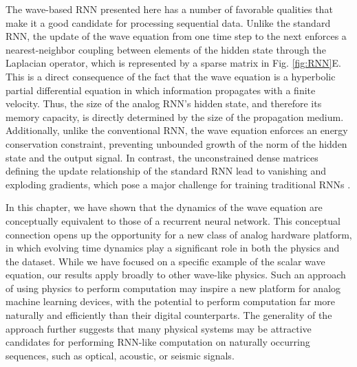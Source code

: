 The wave-based RNN presented here has a number of favorable qualities that make it a good candidate for processing sequential data.
Unlike the standard RNN, the update of the wave equation from one time step to the next enforces a nearest-neighbor coupling between elements of the hidden state through the Laplacian operator, which is represented by a sparse matrix in Fig. \ref{fig:RNN}E. 
This is a direct consequence of the fact that the wave equation is a hyperbolic partial differential equation in which information propagates with a finite velocity. 
Thus, the size of the analog RNN's hidden state, and therefore its memory capacity, is directly determined by the size of the propagation medium. 
Additionally, unlike the conventional RNN, the wave equation enforces an energy conservation constraint, preventing unbounded growth of the norm of the hidden state and the output signal.
In contrast, the unconstrained dense matrices defining the update relationship of the standard RNN lead to vanishing and exploding gradients, which pose a major challenge for training traditional RNNs \cite{jing2017tunable}.

In this chapter, we have shown that the dynamics of the wave equation are conceptually equivalent to those of a recurrent neural network.
This conceptual connection opens up the opportunity for a new class of analog hardware platform, in which evolving time dynamics play a significant role in both the physics and the dataset.
While we have focused on a specific example of the scalar wave equation, our results apply broadly to other wave-like physics.
Such an approach of using physics to perform computation \cite{silva_performing_2014, hermans_trainable_2015, guo_photonic_2018, lin2018all, kwon_nonlocal_2018, estakhri_inverse-designed_2019} may inspire a new platform for analog machine learning devices, with the potential to perform computation far more naturally and efficiently than their digital counterparts.
The generality of the approach further suggests that many physical systems may be attractive candidates for performing RNN-like computation on naturally occurring sequences, such as optical, acoustic, or seismic signals.
